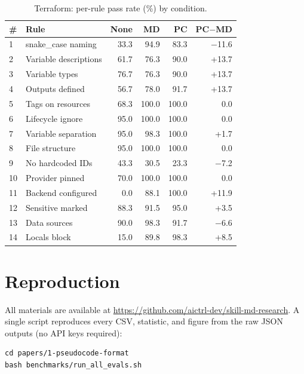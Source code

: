 \documentclass[sigconf,nonacm]{acmart}
\begin{document}
\begin{table}[h]
\caption{Terraform: per-rule pass rate (\%) by condition.}
\label{tab:per-rule-terraform}
\centering\small
\begin{tabular}{llrrrr}
\toprule
\textbf{\#} & \textbf{Rule} & \textbf{None} & \textbf{MD} & \textbf{PC} & \textbf{PC$-$MD} \\
\midrule
1  & snake\_case naming       &  33.3 &  94.9 &  83.3 &  $-$11.6 \\
2  & Variable descriptions    &  61.7 &  76.3 &  90.0 &  +13.7 \\
3  & Variable types           &  76.7 &  76.3 &  90.0 &  +13.7 \\
4  & Outputs defined          &  56.7 &  78.0 &  91.7 &  +13.7 \\
5  & Tags on resources        &  68.3 & 100.0 & 100.0 &    0.0 \\
6  & Lifecycle ignore         &  95.0 & 100.0 & 100.0 &    0.0 \\
7  & Variable separation      &  95.0 &  98.3 & 100.0 &   +1.7 \\
8  & File structure           &  95.0 & 100.0 & 100.0 &    0.0 \\
9  & No hardcoded IDs         &  43.3 &  30.5 &  23.3 &   $-$7.2 \\
10 & Provider pinned          &  70.0 & 100.0 & 100.0 &    0.0 \\
11 & Backend configured       &   0.0 &  88.1 & 100.0 &  +11.9 \\
12 & Sensitive marked         &  88.3 &  91.5 &  95.0 &   +3.5 \\
13 & Data sources             &  90.0 &  98.3 &  91.7 &   $-$6.6 \\
14 & Locals block             &  15.0 &  89.8 &  98.3 &   +8.5 \\
\bottomrule
\end{tabular}
\end{table}


\section{Reproduction}\label{app:repro}

All materials are available at
\url{https://github.com/aictrl-dev/skill-md-research}.
A single script reproduces every CSV, statistic, and figure from the
raw JSON outputs (no API keys required):

\begin{verbatim}
cd papers/1-pseudocode-format
bash benchmarks/run_all_evals.sh
\end{verbatim}
\end{document}
